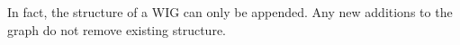 In fact, the structure of a WIG can only be appended. Any new additions to the graph do not remove existing structure.




